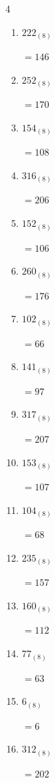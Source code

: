 \begin{multicols}{4}
\begin{enumerate}
\columnbreak %

  \item $222_{(8)}$

        $=146$

  \item $252_{(8)}$

        $=170$

  \item $154_{(8)}$

        $=108$

  \item $316_{(8)}$

        $=206$

  \item $152_{(8)}$

        $=106$

  \item $260_{(8)}$

        $=176$

  \item $102_{(8)}$

        $=66$

  \item $141_{(8)}$

        $=97$

  \item $317_{(8)}$

        $=207$

  \item $153_{(8)}$

        $=107$

  \item $104_{(8)}$

        $=68$

  \item $235_{(8)}$

        $=157$

  \item $160_{(8)}$

        $=112$

  \item $77_{(8)}$

        $=63$

  \item $6_{(8)}$

        $=6$

\columnbreak %

  \item $312_{(8)}$

        $=202$


\end{enumerate}
\end{multicols}
